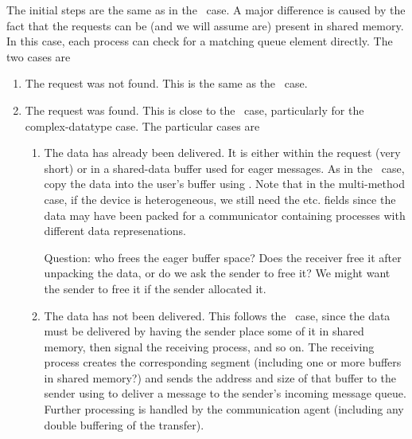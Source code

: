 The initial steps are the same as in the \tcpname\ case.  A major difference
is caused by the fact that the requests can be (and we will assume are)
present in shared memory.  In this case, each process can check for a matching
queue element directly. The two cases are
\begin{enumerate}
\item The request was not found.  This is the same as the \tcpname\ case.
\item The request was found.  This is close to the \tcpname\ case,
  particularly for the complex-datatype case.  The particular cases are
  \begin{enumerate}
  \item The data has already been delivered.  It is either within the request
    (very short) or in a shared-data buffer used for eager messages.  As in
    the \tcpname\ case, copy the data into the user's buffer using
    .  Note that in the multi-method case, if the device
    is heterogeneous, we still need the  etc. fields
    since the data may have been packed for a communicator containing
    processes with different data represenations.

    Question: who frees the eager buffer space?  Does the receiver free it
    after unpacking the data, or do we ask the sender to free it?  We might
    want the sender to free it if the sender allocated it.

  \item The data has not been delivered.  This follows the \tcpname\ case,
    since the data must be delivered by having the sender place some of it in
    shared memory, then signal the receiving process, and so on.  The
    receiving process creates the corresponding segment (including one or more
    buffers in shared memory?) and sends the address and size of that buffer
    to the sender using  to deliver a message to the
    sender's incoming message queue.  Further processing is handled by the
    communication agent (including any double buffering of the transfer).
  \end{enumerate}
\end{enumerate}



